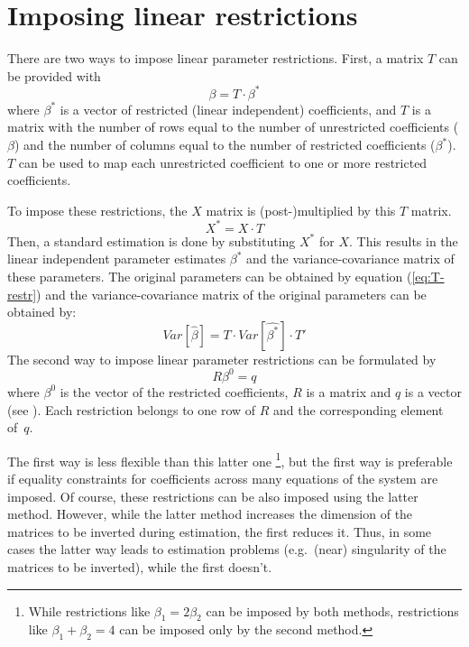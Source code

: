 \section{Imposing linear restrictions}\label{sec:Restrictions}

There are two ways to impose linear parameter restrictions.
First, a matrix $T$ can be provided with
\begin{equation}
   \beta = T \cdot \beta^* \label{eq:T-restr} 
\end{equation}
where $\beta^*$ is a vector of restricted (linear independent) coefficients,
and $T$ is a matrix with the number of rows equal to the number of
unrestricted coefficients ($\beta$) and
the number of columns equal to the number of restricted coefficients
($\beta^*$).
$T$ can be used to map each unrestricted coefficient to one or more
restricted coefficients.

To impose these restrictions, the $X$ matrix is
(post-)multiplied by this $T$ matrix.
\begin{equation}
    X^* = X \cdot T
\end{equation}
Then, a standard estimation is done by substituting $X^*$ for $X$.
This results in the linear independent parameter estimates $\beta^*$ and
the variance-covariance matrix of these parameters. 
The original parameters can be obtained by equation (\ref{eq:T-restr})
and the variance-covariance matrix of the original parameters 
can be obtained by:
\begin{equation}
   Var \left[ \widehat{\beta} \right] = T \cdot Var \left[ \widehat{\beta^*} \right] \cdot T'
\end{equation}
The second way to impose linear parameter restrictions
can be formulated by
\begin{equation}
   R \beta^0 = q
\end{equation}
where $\beta^0$ is the vector of the restricted coefficients, 
$R$ is a matrix and $q$ is a vector (see \citealp[p.\ 100]{greene03}).
Each restriction belongs to one row of $R$ and the corresponding 
element of~$q$.

The first way is less flexible than this latter one%
\footnote{
While restrictions like $\beta_1 = 2 \beta_2$ can be imposed by
both methods,
restrictions like $\beta_1 + \beta_2 = 4$ can be imposed only
by the second method.
}, 
but the first way is preferable if equality constraints for coefficients
across many equations of the system are imposed. 
Of course, these restrictions can be also imposed using
the latter method.
However, while the latter method increases the dimension of the 
matrices to be inverted during estimation, the first reduces it. 
Thus, in some cases the latter way leads to estimation problems
(e.g.\ (near) singularity of the matrices to be inverted),
while the first doesn't.

